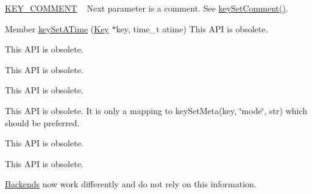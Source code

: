 \begin{DoxyRefList}
\begin{DoxyItemize}
\item \mbox{\hyperlink{group__key_gga91fb3178848bd682000958089abbaf40ac29427bb47cc31689d02912e36161ee3}{K\+E\+Y\+\_\+\+C\+O\+M\+M\+E\+NT}} ~\newline
 Next parameter is a comment. See \mbox{\hyperlink{group__meta_ga8863a877a84fa46e6017fe72e49b89c1}{key\+Set\+Comment()}}. 
\begin{DoxyCodeInclude}{0}
\end{DoxyCodeInclude}
Member \mbox{\hyperlink{group__meta_ga995d8b84731673c88c7c01f3fed538b9}{key\+Set\+A\+Time}} (\mbox{\hyperlink{classkdb_1_1Key}{Key}} $\ast$key, time\+\_\+t atime) \label{deprecated__deprecated000022}%
%
This A\+PI is obsolete. 
\end{DoxyItemize}
\item[Member \mbox{\hyperlink{group__meta_ga9f502ecab8ab43f0b17220fcc95f3fa5}{key\+Set\+C\+Time}} (\mbox{\hyperlink{classkdb_1_1Key}{Key}} $\ast$key, time\+\_\+t ctime)]\label{deprecated__deprecated000026}%
%
This A\+PI is obsolete. 
\item[Member \mbox{\hyperlink{group__meta_gaae575bd86a628a15ee45baa860522e75}{key\+Set\+Dir}} (\mbox{\hyperlink{classkdb_1_1Key}{Key}} $\ast$key)]\label{deprecated__deprecated000018}%
%
This A\+PI is obsolete. 
\item[Member \mbox{\hyperlink{group__meta_ga9e3d0fb3f7ba906e067727b9155d22e3}{key\+Set\+G\+ID}} (\mbox{\hyperlink{classkdb_1_1Key}{Key}} $\ast$key, gid\+\_\+t gid)]\label{deprecated__deprecated000017}%
%
This A\+PI is obsolete. 
\item[Member \mbox{\hyperlink{group__meta_ga8803037e35b9da1ce492323a88ff6bc3}{key\+Set\+Mode}} (\mbox{\hyperlink{classkdb_1_1Key}{Key}} $\ast$key, mode\+\_\+t mode)]\label{deprecated__deprecated000020}%
%
This A\+PI is obsolete. It is only a mapping to key\+Set\+Meta(key, \char`\"{}mode\char`\"{}, str) which should be preferred. 
\item[Member \mbox{\hyperlink{group__meta_ga481d8997187992fe4bbf288bc8ef4db7}{key\+Set\+M\+Time}} (\mbox{\hyperlink{classkdb_1_1Key}{Key}} $\ast$key, time\+\_\+t mtime)]\label{deprecated__deprecated000024}%
%
This A\+PI is obsolete. 
\item[Member \mbox{\hyperlink{group__meta_gab5f284f5ecd261e0a290095f50ba1af7}{key\+Set\+U\+ID}} (\mbox{\hyperlink{classkdb_1_1Key}{Key}} $\ast$key, uid\+\_\+t uid)]\label{deprecated__deprecated000015}%
%
This A\+PI is obsolete. 
\item[Member \mbox{\hyperlink{group__keyset_ga8f210432e664d8ba06d7d55a2aba2d0f}{ks\+Need\+Sync}} (const \mbox{\hyperlink{classkdb_1_1KeySet}{Key\+Set}} $\ast$ks)]\label{deprecated__deprecated000011}%
%
\mbox{\hyperlink{classkdb_1_1tools_1_1Backends}{Backends}} now work differently and do not rely on this information.
\end{DoxyRefList}